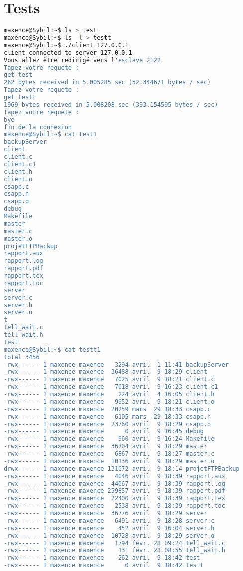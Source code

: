 \documentclass{report}
\begin{document}
      \section{Tests}
\begin{lstlisting}[frame=single,basicstyle=\footnotesize,language=bash]
maxence@Sybil:~$ ls > test
maxence@Sybil:~$ ls -l > testt
maxence@Sybil:~$ ./client 127.0.0.1
client connected to server 127.0.0.1
Vous allez être redirigé vers l'esclave 2122
Tapez votre requete :
get test
262 bytes received in 5.005285 sec (52.344671 bytes / sec)
Tapez votre requete :
get testt
1969 bytes received in 5.008208 sec (393.154595 bytes / sec)
Tapez votre requete :
bye
fin de la connexion
maxence@Sybil:~$ cat test1
backupServer
client
client.c
client.c1
client.h
client.o
csapp.c
csapp.h
csapp.o
debug
Makefile
master
master.c
master.o
projetFTPBackup
rapport.aux
rapport.log
rapport.pdf
rapport.tex
rapport.toc
server
server.c
server.h
server.o
t
tell_wait.c
tell_wait.h
test
maxence@Sybil:~$ cat testt1
total 3456
-rwx------ 1 maxence maxence   3294 avril  1 11:41 backupServer
-rwx------ 1 maxence maxence  36488 avril  9 18:29 client
-rwx------ 1 maxence maxence   7025 avril  9 18:21 client.c
-rwx------ 1 maxence maxence   7018 avril  9 16:23 client.c1
-rwx------ 1 maxence maxence    224 avril  4 16:05 client.h
-rwx------ 1 maxence maxence   9952 avril  9 18:21 client.o
-rwx------ 1 maxence maxence  20259 mars  29 18:33 csapp.c
-rwx------ 1 maxence maxence   6105 mars  29 18:33 csapp.h
-rwx------ 1 maxence maxence  23760 avril  9 18:29 csapp.o
-rwx------ 1 maxence maxence      0 avril  9 16:45 debug
-rwx------ 1 maxence maxence    960 avril  9 16:24 Makefile
-rwx------ 1 maxence maxence  36704 avril  9 18:29 master
-rwx------ 1 maxence maxence   6867 avril  9 18:27 master.c
-rwx------ 1 maxence maxence  10136 avril  9 18:29 master.o
drwx------ 1 maxence maxence 131072 avril  9 18:14 projetFTPBackup
-rwx------ 1 maxence maxence   4046 avril  9 18:39 rapport.aux
-rwx------ 1 maxence maxence  44067 avril  9 18:39 rapport.log
-rwx------ 1 maxence maxence 259857 avril  9 18:39 rapport.pdf
-rwx------ 1 maxence maxence  22400 avril  9 18:39 rapport.tex
-rwx------ 1 maxence maxence   2538 avril  9 18:39 rapport.toc
-rwx------ 1 maxence maxence  36776 avril  9 18:29 server
-rwx------ 1 maxence maxence   6491 avril  9 18:28 server.c
-rwx------ 1 maxence maxence    452 avril  9 16:04 server.h
-rwx------ 1 maxence maxence  10728 avril  9 18:29 server.o
-rwx------ 1 maxence maxence   1794 févr. 28 09:24 tell_wait.c
-rwx------ 1 maxence maxence    131 févr. 28 08:55 tell_wait.h
-rwx------ 1 maxence maxence    262 avril  9 18:42 test
-rwx------ 1 maxence maxence      0 avril  9 18:42 testt
\end{lstlisting}
\end{document}
